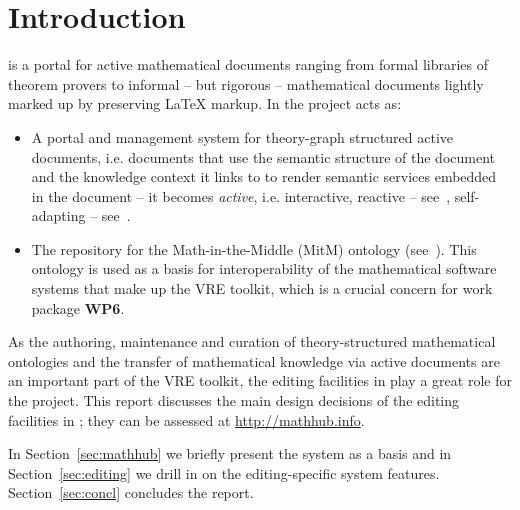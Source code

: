 \section{Introduction}\label{sec:intro}

\sys is a portal for active mathematical documents ranging from formal libraries of
theorem provers to informal -- but rigorous -- mathematical documents lightly marked up by
preserving {\LaTeX} markup. In the \pn project \sys acts as: 
\begin{itemize}
\item A portal and management system for theory-graph structured active documents,
  i.e. documents that use the semantic structure of the document and the knowledge context
  it links to to render semantic services embedded in the document -- it becomes
  \emph{active}, i.e. interactive, reactive -- see~\cite{ODK-D4.3}, self-adapting --
  see~\cite{ODK-D4.2}.
\item The repository for the Math-in-the-Middle (MitM) ontology
  (see~\cite{DehKohKon:iop16,ODK-D6.2}). This ontology is used as a basis for
  interoperability of the mathematical software systems that make up the \pn VRE toolkit,
  which is a crucial concern for work package \textbf{WP6}.
\end{itemize}
As the authoring, maintenance and curation of theory-structured mathematical ontologies
and the transfer of mathematical knowledge via active documents are an important part of
the \pn VRE toolkit, the editing facilities in \sys play a great role for the
project. This report discusses the main design decisions of the editing facilities in
\sys; they can be assessed at \url{http://mathhub.info}.

In Section~\ref{sec:mathhub} we briefly present the \sys system as a basis and in
Section~\ref{sec:editing} we drill in on the editing-specific system
features. Section~\ref{sec:concl} concludes the report. 


